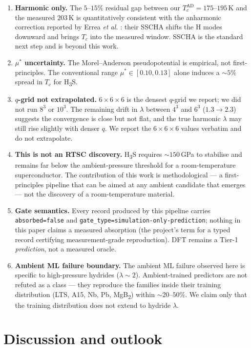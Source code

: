 \documentclass[11pt,a4paper]{article}
\begin{document}
\begin{enumerate}\itemsep0.4em
\item \textbf{Harmonic only.} The $5$--$15\%$ residual gap between our
$T_c^{\text{AD}} = 175$--$195$\,K and the measured $203$\,K is quantitatively
consistent with the anharmonic correction reported by Errea \emph{et al.}
\cite{errea2016h3s}: their SSCHA shifts the H modes downward and brings $T_c$
into the measured window. SSCHA is the standard next step and is beyond this
work.
\item \textbf{$\mu^*$ uncertainty.} The Morel--Anderson \cite{morelanderson1962}
pseudopotential is empirical, not first-principles. The conventional range $\mu^*
\in [0.10, 0.13]$ alone induces a $\sim 5\%$ spread in $T_c$ for H\textsubscript{3}S.
\item \textbf{$q$-grid not extrapolated.} $6{\times}6{\times}6$ is the densest
$q$-grid we report; we did not run $8^3$ or $10^3$. The remaining drift in
$\lambda$ between $4^3$ and $6^3$ ($1.3 \to 2.3$) suggests the convergence is
close but not flat, and the true harmonic $\lambda$ may still rise slightly with
denser $q$. We report the $6{\times}6{\times}6$ values verbatim and do not
extrapolate.
\item \textbf{This is not an RTSC discovery.} H\textsubscript{3}S requires
$\sim 150$\,GPa to stabilise and remains far below the ambient-pressure
threshold for a room-temperature superconductor. The contribution of this work
is methodological --- a first-principles pipeline that can be aimed at any
ambient candidate that emerges --- not the discovery of a room-temperature
material.
\item \textbf{Gate semantics.} Every record produced by this pipeline carries
\texttt{absorbed=false} and \texttt{gate\_type=simulation-only-prediction};
nothing in this paper claims a measured absorption (the project's term for a
typed record certifying measurement-grade reproduction). DFT remains a Tier-1
\emph{prediction}, not a measured oracle.
\item \textbf{Ambient ML failure boundary.} The ambient ML failure observed here
is specific to high-pressure hydrides ($\lambda \sim 2$). Ambient-trained
predictors are not refuted as a class --- they reproduce the families inside
their training distribution (LTS, A15, Nb, Pb, MgB\textsubscript{2}) within
$\sim 20$--$50\%$. We claim only that the training distribution does not extend
to hydride $\lambda$.
\end{enumerate}

\section{Discussion and outlook}
\label{sec:discussion}
\end{document}
